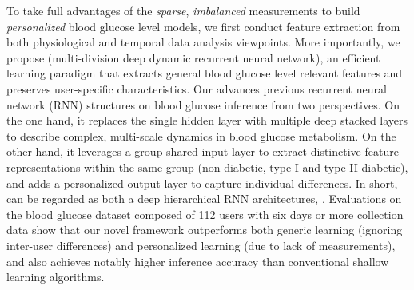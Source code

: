 To take full advantages of the \emph{sparse}, \emph{imbalanced} measurements to build \emph{personalized} blood glucose level models, we first conduct feature extraction from both physiological and temporal data analysis viewpoints. More importantly, we propose \modelname (multi-division deep dynamic recurrent neural network), an efficient learning paradigm that extracts general blood glucose level relevant features and preserves user-specific characteristics.
Our \modelname advances previous recurrent neural network (RNN) structures on blood glucose inference from two perspectives.
On the one hand, it replaces the single hidden layer with multiple deep stacked layers to describe complex, multi-scale dynamics in blood glucose metabolism.
On the other hand, it leverages a group-shared input layer to extract distinctive feature representations within the same group (\ie non-diabetic, type I and type II diabetic), and adds a personalized output layer to capture individual differences.
In short, \modelname can be regarded as both a deep hierarchical RNN architectures, .
Evaluations on the blood glucose dataset composed of 112 users with six days or more collection data show that our novel \modelname framework outperforms both generic learning (\ie ignoring inter-user differences) and personalized learning (due to lack of measurements), and also achieves notably higher inference accuracy than conventional shallow learning algorithms.

